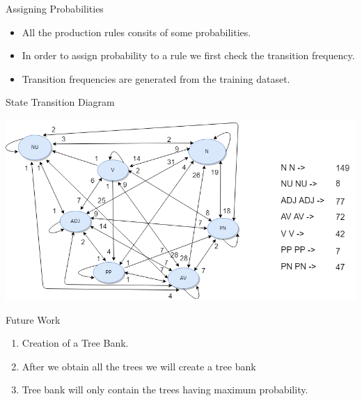 \documentclass{beamer}
\begin{document}
\begin{frame}{Assigning Probabilities}
\begin{itemize}
	\item All the production rules consits of some probabilities. \\
	\vspace{0.5em}
	\item In order to assign probability to a rule we first check the transition frequency.
	\vspace{0.5em}
	\item Transition frequencies are generated from the training dataset.
	\vspace{0.5em}	                             
\end{itemize}
\end{frame}


\begin{frame}{State Transition Diagram}
\begin{center}
	\includegraphics[scale=0.4]{44.png}	
\end{center}
\end{frame}



\begin{frame}{Future Work}
\begin{enumerate}	
	\item Creation of a Tree Bank.  
	\vspace{1em}
	\item After we obtain all the trees we will create a tree bank
	\vspace{1em}
	\item Tree bank will only contain the trees having maximum probability.
\end{enumerate}
\end{frame}
\end{document}

